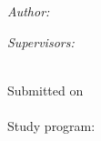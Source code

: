 \begin{titlepage}
\begin{center}
 
\begin{minipage}[t]{0.4\textwidth}
\begin{flushleft} 
    \large
    \emph{Author:}\\
    \authorname
\end{flushleft}
\end{minipage}
\begin{minipage}[t]{0.4\textwidth}
\begin{flushright} 
    \large
    \emph{Supervisors:} \\
    \supnameA \\
    \supnameB
\end{flushright}
\end{minipage}
\vspace{2cm}
 
\vfill

{\large
Submitted on\\
\tdate\\
\vspace{1.5cm}
Study program:\\
\studyprog\\
}
\vfill
\end{center}
\end{titlepage}
\restoregeometry
